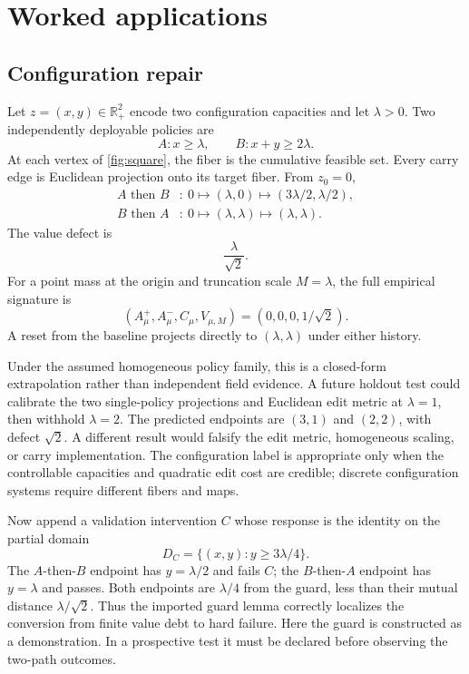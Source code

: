 \documentclass[11pt]{article}
\theoremstyle{definition}
\theoremstyle{remark}
\newcommand{\R}{\mathbb{R}}
\begin{document}
\section{Worked applications}

\subsection{Configuration repair}

Let \(z=(x,y)\in\R_+^2\) encode two configuration capacities and let
\(\lambda>0\). Two independently deployable policies are
\[
A:x\ge\lambda,\qquad
B:x+y\ge2\lambda.
\]
At each vertex of \cref{fig:square}, the fiber is the cumulative feasible
set. Every carry edge is Euclidean projection onto its target fiber. From
\(z_0=0\),
\begin{align*}
A\text{ then }B &:\
0\mapsto(\lambda,0)\mapsto
(3\lambda/2,\lambda/2),\\
B\text{ then }A &:\
0\mapsto(\lambda,\lambda)\mapsto
(\lambda,\lambda).
\end{align*}
The value defect is
\[
\frac{\lambda}{\sqrt2}.
\]
For a point mass at the origin and truncation scale \(M=\lambda\), the full
empirical signature is
\[
(A_\mu^+,A_\mu^-,C_\mu,V_{\mu,M})
=(0,0,0,1/\sqrt2).
\]
A reset from the baseline projects directly to
\((\lambda,\lambda)\) under either history.

Under the assumed homogeneous policy family, this is a closed-form
extrapolation rather than independent field evidence. A future holdout test
could calibrate the two single-policy projections and Euclidean edit metric at
\(\lambda=1\), then withhold \(\lambda=2\). The predicted endpoints are
\((3,1)\) and \((2,2)\), with defect \(\sqrt2\). A different result would
falsify the edit metric, homogeneous scaling, or carry implementation. The
configuration label is appropriate only when the controllable capacities and
quadratic edit cost are credible; discrete configuration systems require
different fibers and maps.

Now append a validation intervention \(C\) whose response is the identity on
the partial domain
\[
D_C=\{(x,y):y\ge3\lambda/4\}.
\]
The \(A\)-then-\(B\) endpoint has \(y=\lambda/2\) and fails \(C\); the
\(B\)-then-\(A\) endpoint has \(y=\lambda\) and passes. Both endpoints are
\(\lambda/4\) from the guard, less than their mutual distance
\(\lambda/\sqrt2\). Thus the imported guard lemma correctly localizes the
conversion from finite value debt to hard failure. Here the guard is
constructed as a demonstration. In a prospective test it must be declared
before observing the two-path outcomes.
\end{document}
